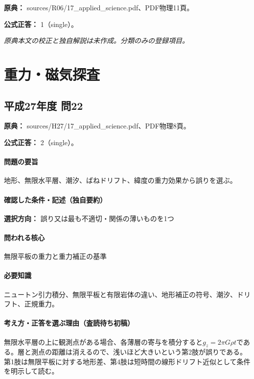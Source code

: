 \noindent\textbf{原典：} sources/R06/17\_applied\_science.pdf、PDF物理11頁。

\textbf{公式正答：} 1（single）。

\par\textit{原典本文の校正と独自解説は未作成。分類のみの登録項目。}

\section{重力・磁気探査}

\subsection{平成27年度 問22}
\label{q:h27-reg-applied-22}

\noindent\textbf{原典：} sources/H27/17\_applied\_science.pdf、PDF物理8頁。

\textbf{公式正答：} 2（single）。

\paragraph{問題の要旨} 地形、無限水平層、潮汐、ばねドリフト、緯度の重力効果から誤りを選ぶ。

\paragraph{確認した条件・記述（独自要約）}\mbox{}\par

\noindent\textbf{選択方向：} 誤り又は最も不適切・関係の薄いものを1つ\par

\paragraph{問われる核心} 無限平板の重力と重力補正の基準

\paragraph{必要知識} ニュートン引力積分、無限平板と有限岩体の違い、地形補正の符号、潮汐、ドリフト、正規重力。

\paragraph{考え方・正答を選ぶ理由（査読待ち初稿）} 無限水平層の上に観測点がある場合、各薄層の寄与を積分すると\(g_z=2\pi G\rho t\)である。層と測点の距離は消えるので、浅いほど大きいという第2肢が誤りである。第1肢は無限平板に対する地形差、第4肢は短時間の線形ドリフト近似として条件を明示して読む。

